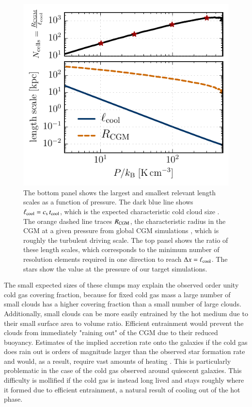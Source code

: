 \documentclass[11pt,letterpaper,english]{article}
\begin{document}
\begin{figure}[ht]
    \centering
    \begin{minipage}{0.425\textwidth}
	\caption{ The bottom panel shows the largest and smallest relevant length scales as a function of pressure. The dark blue line shows $\ell_{\rm cool} = c_{\rm s} \, t_{\rm cool}$, which is the expected characteristic cold cloud size \cite{McCourt18}. The orange dashed line traces $R_{\rm CGM}$, the characteristic radius in the CGM at a given pressure from global CGM simulations \cite{Fielding17}, which is roughly the turbulent driving scale. The top panel shows the ratio of these length scales, which corresponds to the minimum number of resolution elements required in one direction to reach $\Delta x = \ell_{\rm cool}$. The stars show the value at the pressure of our target simulations. \label{fig:cs_tcool}}
    \end{minipage}\hfill
    \begin{minipage}{0.575\textwidth}
        \includegraphics[width=\textwidth]{length_scales_sim.pdf} 
    \end{minipage}
\end{figure}

The small expected sizes of these clumps may explain the observed order unity cold gas covering fraction, because for fixed cold gas mass a large number of small clouds has a higher covering fraction than a small number of large clouds. Additionally, small clouds can be more easily entrained by the hot medium due to their small surface area to volume ratio. Efficient entrainment would prevent the clouds from immediately "raining out" of the CGM due to their reduced buoyancy. Estimates of the implied accretion rate onto the galaxies if the cold gas does rain out is orders of magnitude larger than the observed star formation rate and would, as a result, require vast amounts of heating \cite{McQuinnWerk}. This is particularly problematic in the case of the cold gas observed around quiescent galaxies. This difficulty is mollified if the cold gas is instead long lived and stays roughly where it formed due to efficient entrainment, a natural result of cooling out of the hot phase.
\end{document}
